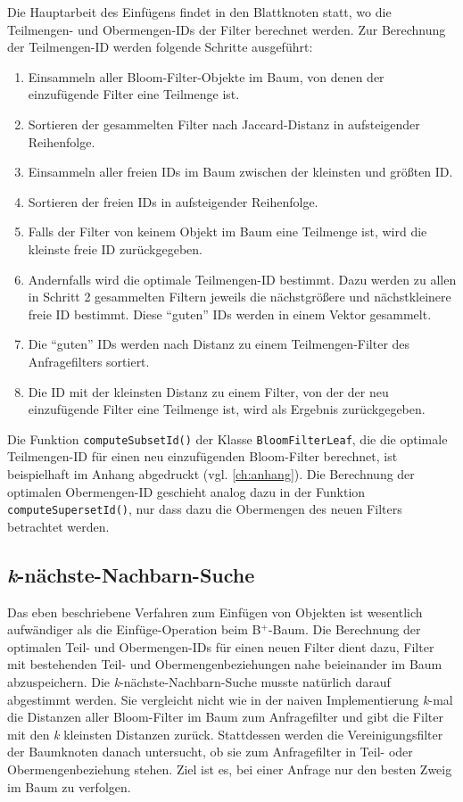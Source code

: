 Die Hauptarbeit des Einfügens findet in den Blattknoten statt, wo die Teilmengen- und Obermengen-IDs der Filter berechnet werden. Zur Berechnung der Teil\-mengen-ID werden folgende Schritte ausgeführt: 
\begin{enumerate}
\setlength{\itemsep}{20pt}
	\item Einsammeln aller Bloom-Filter-Objekte im Baum, von denen der einzufügende Filter eine Teilmenge ist.
	\item Sortieren der gesammelten Filter nach Jaccard-Distanz in aufsteigender Reihenfolge.
	\item Einsammeln aller freien IDs im Baum zwischen der kleinsten und größten ID. 
	\item Sortieren der freien IDs in aufsteigender Reihenfolge.
	\item Falls der Filter von keinem Objekt im Baum eine Teilmenge ist, wird die kleinste freie ID zurückgegeben. 
	\item Andernfalls wird die optimale Teilmengen-ID bestimmt. Dazu werden zu allen in Schritt 2 gesammelten Filtern jeweils die nächstgrößere und nächstkleinere freie ID bestimmt. Diese "`guten"' IDs werden in einem Vektor gesammelt. 
	\item Die "`guten"' IDs werden nach Distanz zu einem Teilmengen-Filter des Anfragefilters sortiert. 
	\item Die ID mit der kleinsten Distanz zu einem Filter, von der der neu einzufügende Filter eine Teilmenge ist, wird als Ergebnis zurückgegeben. 
\end{enumerate}
Die Funktion \texttt{computeSubsetId()} der Klasse \texttt{BloomFilterLeaf}, die die optimale Teilmengen-ID für einen neu einzufügenden Bloom-Filter berechnet, ist beispielhaft im Anhang abgedruckt (vgl. \ref{ch:anhang}). Die Berechnung der optimalen Obermengen-ID geschieht analog dazu in der Funktion \texttt{computeSupersetId()}, nur dass dazu die Obermengen des neuen Filters betrachtet werden. 
\subsection{\textit{k}-nächste-Nachbarn-Suche}\label{sec:knn}
Das eben beschriebene Verfahren zum Einfügen von Objekten ist wesentlich aufwändiger als die Einfüge-Operation beim B$^+$-Baum. Die Berechnung der optimalen Teil- und Obermengen-IDs für einen neuen Filter dient dazu, Filter mit bestehenden Teil- und Obermengenbeziehungen nahe beieinander im Baum abzuspeichern. Die \textit{k}-nächste-Nachbarn-Suche musste natürlich darauf abgestimmt werden. Sie vergleicht nicht wie in der naiven Implementierung \textit{k}-mal die Distanzen aller Bloom-Filter im Baum zum Anfragefilter und gibt die Filter mit den \textit{k} kleinsten Distanzen zurück. Stattdessen werden die Vereinigungsfilter der Baumknoten danach untersucht, ob sie zum Anfragefilter in Teil- oder Obermengenbeziehung stehen. Ziel ist es, bei einer Anfrage nur den besten Zweig im Baum zu verfolgen.

